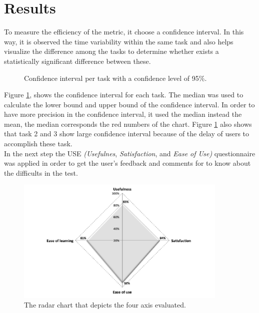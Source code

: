 \section{Results}

To measure the efficiency of the metric, it choose a confidence
interval. In this way, it is observed the time variability within the
same task and also helps visualize the difference among the tasks to
determine whether exists a statistically significant difference
between these. 
\begin{figure}
\centering
\captionsetup{font=footnotesize}
\caption{Confidence interval per task with a confidence level of 95\%.}
\label{fig:ci95}   
\end{figure}
Figure \ref{fig:ci95}, shows the confidence interval for each task.
The median was used to calculate the  lower bound and upper bound of
the confidence interval. In  order to have more precision in the
confidence interval, it used the median instead the mean, the median
corresponds the red numbers of the chart. Figure \ref{fig:ci95} also 
shows that task 2 and 3 show large confidence interval because of  
the delay of users to accomplish these task. \\ 
In the next step the USE \textit{(Usefulnes}, \textit{Satisfaction}, and 
\textit{Ease of Use)} questionnaire \cite{morris2001experience} 
was applied in order to get the user's feedback and comments 
for to know about the difficults in the test.  
\begin{figure}
\centering
\small
\captionsetup{font=footnotesize}
\includegraphics[width=0.9\textwidth]{img/radial.png}
\caption{\small{The radar chart that depicts the four axis 
evaluated.}}
\label{fig:radial}   
\end{figure}
